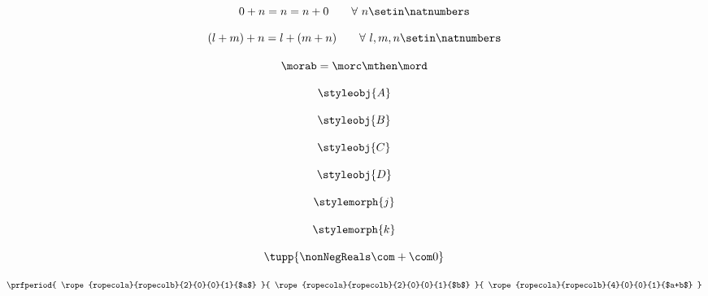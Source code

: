 \begin{forslides}
    \begin{equation}
        \label{eq:semicats-slides-44}
        0 + n = n = n + 0   \quad \quad \forall \ n \setin \natnumbers
    \end{equation}

    \begin{equation}
        \label{eq:semicats-slides-45}
        (l + m) + n = l + (m + n) \quad \quad  \forall \ l, m, n \setin \natnumbers
    \end{equation}

    \begin{equation}
        \label{eq:semicats-slides-46}
        \morab = \morc \mthen \mord
    \end{equation}

    \begin{equation}
        \label{eq:semicats-slides-47}
        \styleobj{A}
    \end{equation}

    \begin{equation}
        \label{eq:semicats-slides-48}
        \styleobj{B}
    \end{equation}

    \begin{equation}
        \label{eq:4semicats-slides-9}
        \styleobj{C}
    \end{equation}

    \begin{equation}
        \label{eq:semicats-slides-50}
        \styleobj{D}
    \end{equation}

    \begin{equation}
        \label{eq:semicats-slides-51}
        \stylemorph{j}
    \end{equation}

    \begin{equation}
        \label{eq:semicats-slides-52}
        \stylemorph{k}
    \end{equation}
    
    \begin{equation}
        \label{eq:semicats-slides-53a}
        \tupp{\nonNegReals \com + \com 0}
    \end{equation}
    
    

    \begin{equation}
        \label{eq:semicats-slides-53b}
        \prfperiod{
            \rope{ropecola}{ropecolb}{2}{0}{0}{1}{$a$}
        }{
            \rope{ropecola}{ropecolb}{2}{0}{0}{1}{$b$}
        }{
            \rope{ropecola}{ropecolb}{4}{0}{0}{1}{$a+b$}
        }
    \end{equation}


\end{forslides}
